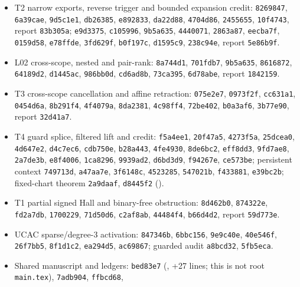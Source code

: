 \documentclass[11pt]{article}
\theoremstyle{definition}
\theoremstyle{remark}
\begin{document}
\begin{itemize}
\item T2 narrow exports, reverse trigger and bounded expansion credit: \texttt{8269847},
\texttt{6a39cae}, \texttt{9d5c1e1}, \texttt{db26385}, \texttt{e892833}, \texttt{da22d88},
\texttt{4704d86}, \texttt{2455655}, \texttt{10f4743}, report \texttt{83b305a}; \texttt{e9d3375},
\texttt{c105996}, \texttt{9b5a635}, \texttt{4440071}, \texttt{2863a87}, \texttt{eecba7f},
\texttt{0159d58}, \texttt{e78ffde}, \texttt{3fd629f}, \texttt{b0f197c}, \texttt{d1595c9},
\texttt{238c94e}, report \texttt{5e86b9f}.
\item L02 cross-scope, nested and pair-rank: \texttt{8a744d1}, \texttt{701fdb7},
\texttt{9b5a635}, \texttt{8616872}, \texttt{64189d2}, \texttt{d1445ac}, \texttt{986bb0d},
\texttt{cd6ad8b}, \texttt{73ca395}, \texttt{6d78abe}, report \texttt{1842159}.
\item T3 cross-scope cancellation and affine retraction: \texttt{075e2e7}, \texttt{0973f2f},
\texttt{cc631a1}, \texttt{0454d6a}, \texttt{8b291f4}, \texttt{4f4079a}, \texttt{8da2381},
\texttt{4c98ff4}, \texttt{72be402}, \texttt{b0a3af6}, \texttt{3b77e90}, report \texttt{32d41a7}.
\item T4 guard splice, filtered lift and credit: \texttt{f5a4ee1}, \texttt{20f47a5},
\texttt{4273f5a}, \texttt{25dcea0}, \texttt{4d647e2}, \texttt{d4c7ec6}, \texttt{cdb750e},
\texttt{b28a443}, \texttt{4fe4930}, \texttt{8de6bc2}, \texttt{eff8dd3}, \texttt{9fd7ae8},
\texttt{2a7de3b}, \texttt{e8f4006}, \texttt{1ca8296}, \texttt{9939ad2}, \texttt{d6bd3d9},
\texttt{f94267e}, \texttt{ce573be}; persistent context \texttt{749713d}, \texttt{a47aa7e},
\texttt{3f6148c}, \texttt{4523285}, \texttt{547021b}, \texttt{f433881}, \texttt{e39bc2b};
fixed-chart theorem \texttt{2a9daaf}, \texttt{d8445f2}
().
\item T1 partial signed Hall and binary-free obstruction: \texttt{8d462b0}, \texttt{874322e},
\texttt{fd2a7db}, \texttt{1700229}, \texttt{71d50d6}, \texttt{c2af8ab}, \texttt{44484f4},
\texttt{b66d4d2}, report \texttt{59d773e}.
\item UCAC sparse/degree-3 activation: \texttt{847346b}, \texttt{6bbc156}, \texttt{9e9c40e},
\texttt{40e546f}, \texttt{26f7bb5}, \texttt{8f1d1c2}, \texttt{ea294d5}, \texttt{ac69867};
guarded audit \texttt{a8bcd32}, \texttt{5fb5eca}.
\item Shared manuscript and ledgers: \texttt{bed83e7} (,
+27 lines; this is not root \texttt{main.tex}), \texttt{7adb904}, \texttt{ffbcd68},

\end{itemize}
\end{document}
